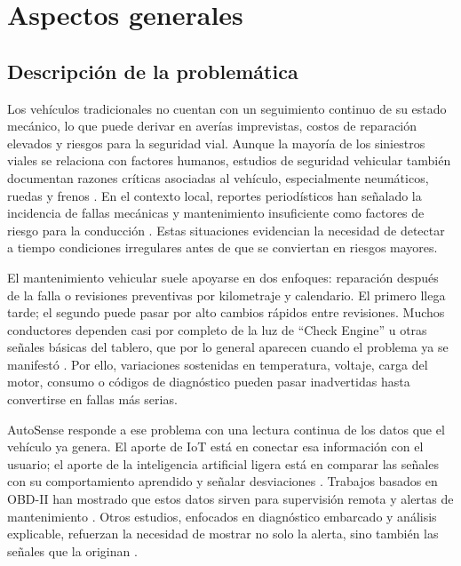\documentclass[12pt,letterpaper]{report}
\begin{document}
\chapter{Aspectos generales}

\section{Descripción de la problemática}

Los vehículos tradicionales no cuentan con un seguimiento continuo de su estado mecánico, lo que puede derivar en averías imprevistas, costos de reparación elevados y riesgos para la seguridad vial. Aunque la mayoría de los siniestros viales se relaciona con factores humanos, estudios de seguridad vehicular también documentan razones críticas asociadas al vehículo, especialmente neumáticos, ruedas y frenos \cite{nhtsa2018_critical_reasons_crashes}. En el contexto local, reportes periodísticos han señalado la incidencia de fallas mecánicas y mantenimiento insuficiente como factores de riesgo para la conducción \cite{laprensa2025_fallas_vehiculos,laprensa2025_fallas_autos}. Estas situaciones evidencian la necesidad de detectar a tiempo condiciones irregulares antes de que se conviertan en riesgos mayores.

El mantenimiento vehicular suele apoyarse en dos enfoques: reparación después de la falla o revisiones preventivas por kilometraje y calendario. El primero llega tarde; el segundo puede pasar por alto cambios rápidos entre revisiones. Muchos conductores dependen casi por completo de la luz de ``Check Engine'' u otras señales básicas del tablero, que por lo general aparecen cuando el problema ya se manifestó \cite{selvaraj2023_advanced_telematics}. Por ello, variaciones sostenidas en temperatura, voltaje, carga del motor, consumo o códigos de diagnóstico pueden pasar inadvertidas hasta convertirse en fallas más serias.

AutoSense responde a ese problema con una lectura continua de los datos que el vehículo ya genera. El aporte de IoT está en conectar esa información con el usuario; el aporte de la inteligencia artificial ligera está en comparar las señales con su comportamiento aprendido y señalar desviaciones \cite{kalalas2025_ai_driven_monitoring}. Trabajos basados en OBD-II han mostrado que estos datos sirven para supervisión remota y alertas de mantenimiento \cite{singh2021_obdii_iot,dabarera2022_iot_vehicle_management}. Otros estudios, enfocados en diagnóstico embarcado y análisis explicable, refuerzan la necesidad de mostrar no solo la alerta, sino también las señales que la originan \cite{tormos2025_explainable_ai,mahale2025_review_predictive_maintenance}.
\end{document}
